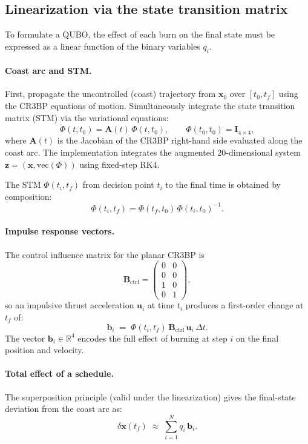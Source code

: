 \documentclass[8pt,a4paper]{article}
\newcommand{\R}{\mathbb{R}}
\newcommand{\bvec}[1]{\bm{#1}}
\newcommand{\xvec}{\bvec{x}}
\newcommand{\uvec}{\bvec{u}}
\theoremstyle{definition}
\theoremstyle{remark}
\begin{document}
\subsection{Linearization via the state transition matrix}

To formulate a QUBO, the effect of each burn on the final state must
be expressed as a linear function of the binary variables $q_i$.

\paragraph{Coast arc and STM.}
First, propagate the uncontrolled (coast) trajectory from $\xvec_0$
over $[t_0, t_f]$ using the CR3BP equations of motion.  Simultaneously
integrate the state transition matrix (STM) via the variational
equations:
\[
  \dot{\Phi}(t, t_0) = \bvec A(t)\,\Phi(t, t_0),
  \qquad \Phi(t_0, t_0) = \bvec I_{4\times 4},
\]
where $\bvec A(t)$ is the Jacobian of the CR3BP right-hand side
evaluated along the coast arc.  The implementation integrates the
augmented 20-dimensional system
$\bvec z = (\xvec, \mathrm{vec}(\Phi))$ using fixed-step RK4.

The STM $\Phi(t_i, t_f)$ from decision point $t_i$ to the final time
is obtained by composition:
\[
  \Phi(t_i, t_f) = \Phi(t_f, t_0)\,\Phi(t_i, t_0)^{-1}.
\]

\paragraph{Impulse response vectors.}
The control influence matrix for the planar CR3BP is
\[
  \bvec B_{\mathrm{ctrl}} =
  \begin{pmatrix} 0 & 0 \\ 0 & 0 \\ 1 & 0 \\ 0 & 1 \end{pmatrix},
\]
so an impulsive thrust acceleration $\uvec_i$ at time $t_i$ produces
a first-order change at $t_f$ of:
\[
  \bvec b_i \;=\; \Phi(t_i, t_f)\, \bvec B_{\mathrm{ctrl}}\, \uvec_i\,
  \Delta t.
\]
The vector $\bvec b_i \in \R^4$ encodes the full effect of burning at
step $i$ on the final position and velocity.

\paragraph{Total effect of a schedule.}
The superposition principle (valid under the linearization) gives the
final-state deviation from the coast arc as:
\[
  \delta\xvec(t_f) \;\approx\; \sum_{i=1}^{N} q_i\, \bvec b_i.
\]
\end{document}
